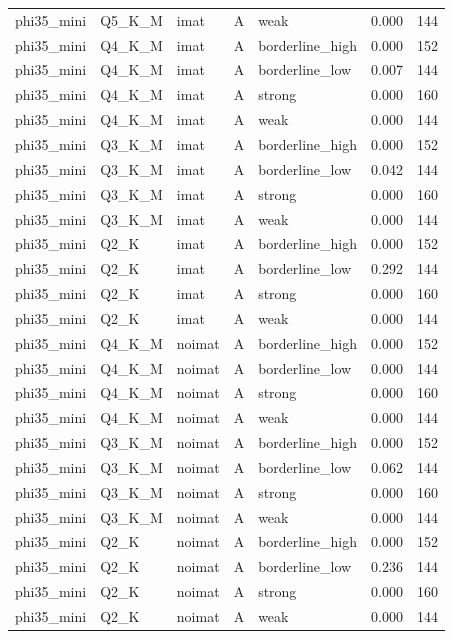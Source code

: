 \begin{tabular}{lllllrr}
phi35\_mini & Q5\_K\_M & imat & A & weak & 0.000 & 144 \\
phi35\_mini & Q4\_K\_M & imat & A & borderline\_high & 0.000 & 152 \\
phi35\_mini & Q4\_K\_M & imat & A & borderline\_low & 0.007 & 144 \\
phi35\_mini & Q4\_K\_M & imat & A & strong & 0.000 & 160 \\
phi35\_mini & Q4\_K\_M & imat & A & weak & 0.000 & 144 \\
phi35\_mini & Q3\_K\_M & imat & A & borderline\_high & 0.000 & 152 \\
phi35\_mini & Q3\_K\_M & imat & A & borderline\_low & 0.042 & 144 \\
phi35\_mini & Q3\_K\_M & imat & A & strong & 0.000 & 160 \\
phi35\_mini & Q3\_K\_M & imat & A & weak & 0.000 & 144 \\
phi35\_mini & Q2\_K & imat & A & borderline\_high & 0.000 & 152 \\
phi35\_mini & Q2\_K & imat & A & borderline\_low & 0.292 & 144 \\
phi35\_mini & Q2\_K & imat & A & strong & 0.000 & 160 \\
phi35\_mini & Q2\_K & imat & A & weak & 0.000 & 144 \\
phi35\_mini & Q4\_K\_M & noimat & A & borderline\_high & 0.000 & 152 \\
phi35\_mini & Q4\_K\_M & noimat & A & borderline\_low & 0.000 & 144 \\
phi35\_mini & Q4\_K\_M & noimat & A & strong & 0.000 & 160 \\
phi35\_mini & Q4\_K\_M & noimat & A & weak & 0.000 & 144 \\
phi35\_mini & Q3\_K\_M & noimat & A & borderline\_high & 0.000 & 152 \\
phi35\_mini & Q3\_K\_M & noimat & A & borderline\_low & 0.062 & 144 \\
phi35\_mini & Q3\_K\_M & noimat & A & strong & 0.000 & 160 \\
phi35\_mini & Q3\_K\_M & noimat & A & weak & 0.000 & 144 \\
phi35\_mini & Q2\_K & noimat & A & borderline\_high & 0.000 & 152 \\
phi35\_mini & Q2\_K & noimat & A & borderline\_low & 0.236 & 144 \\
phi35\_mini & Q2\_K & noimat & A & strong & 0.000 & 160 \\
phi35\_mini & Q2\_K & noimat & A & weak & 0.000 & 144 \\

\end{tabular}
